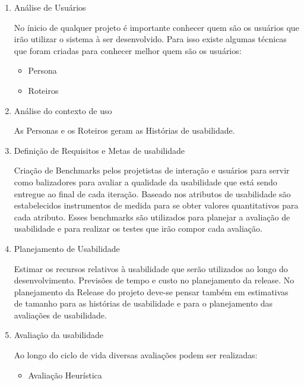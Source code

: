 	
\begin{enumerate}

\item Análise de Usuários
	
	No ínicio de qualquer projeto é importante conhecer quem são os usuários que irão utilizar o sistema à ser desenvolvido. Para isso existe algumas técnicas que foram criadas para conhecer melhor quem são os usuários:
	
	\begin{itemize}
		\item Persona
		\item Roteiros		
	\end{itemize}
		
\item Análise do contexto de uso

		As Personas e os Roteiros geram as Histórias de usabilidade.

\item Definição de Requisitos e Metas de usabilidade

	Criação de Benchmarks pelos projetistas de interação e usuários para servir como balizadores para avaliar a qualidade da usabilidade que está sendo entregue ao final de cada iteração.
	Baseado nos atributos de usabilidade são estabelecidos instrumentos de medida para se obter valores quantitativos 	para cada atributo.
	Esses benchmarks são utilizados para planejar a avaliação de usabilidade e para realizar os testes que irão compor cada avaliação. %
	
		
\item Planejamento de Usabilidade

	Estimar os recursos relativos à usabilidade que serão utilizados ao longo do desenvolvimento. Previsões de tempo e custo no planejamento da release.
	 No planejamento da Release do projeto deve-se pensar também em estimativas de tamanho para as histórias de usabilidade e para o planejamento das avaliações de usabilidade.

\item Avaliação da usabilidade

	Ao longo do ciclo de vida diversas avaliações podem ser realizadas:
	
		
	\begin{itemize}
		\item Avaliação Heurística
		

\end{itemize}
\end{enumerate}
